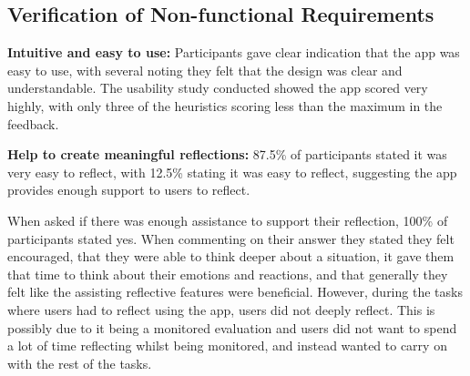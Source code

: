 \documentclass{l4proj}
\begin{document}
    

\subsection{Verification of Non-functional Requirements}

\textbf{Intuitive and easy to use:} Participants gave clear indication that the app was easy to use, with several noting they felt that the design was clear and understandable. The usability study conducted showed the app scored very highly, with only three of the heuristics scoring less than the maximum in the feedback. 

\textbf{Help to create meaningful reflections:} 87.5\% of participants stated it was very easy to reflect, with 12.5\% stating it was easy to reflect, suggesting the app provides enough support to users to reflect. 

When asked if there was enough assistance to support their reflection, 100\% of participants stated yes. When commenting on their answer they stated they felt encouraged, that they were able to think deeper about a situation, it gave them that time to think about their emotions and reactions, and that generally they felt like the assisting reflective features were beneficial. However, during the tasks where users had to reflect using the app, users did not deeply reflect. This is possibly due to it being a monitored evaluation and users did not want to spend a lot of time reflecting whilst being monitored, and instead wanted to carry on with the rest of the tasks.
\end{document}

